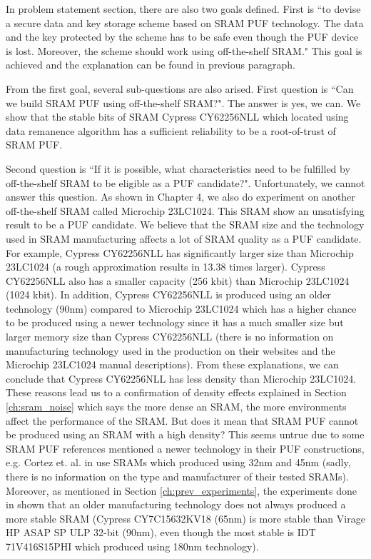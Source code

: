 In problem statement section, there are also two goals defined. First is ``to devise a secure data and key storage scheme based on SRAM PUF technology. The data and the key protected by the scheme has to be safe even though the PUF device is lost. Moreover, the scheme should work using off-the-shelf SRAM." This goal is achieved and the explanation can be found in previous paragraph.

From the first goal, several sub-questions are also arised. First question is ``Can we build SRAM PUF using off-the-shelf SRAM?". The answer is yes, we can. We show that the stable bits of SRAM Cypress CY62256NLL which located using data remanence algorithm has a sufficient reliability to be a root-of-trust of SRAM PUF.

Second question is ``If it is possible, what characteristics need to be fulfilled by off-the-shelf SRAM to be eligible as a PUF candidate?". Unfortunately, we cannot answer this question. As shown in Chapter 4, we also do experiment on another off-the-shelf SRAM called Microchip 23LC1024. This SRAM show an unsatisfying result to be a PUF candidate. We believe that the SRAM size and the technology used in SRAM manufacturing affects a lot of SRAM quality as a PUF candidate. For example, Cypress CY62256NLL has significantly larger size than Microchip 23LC1024 (a rough approximation results in 13.38 times larger). Cypress CY62256NLL also has a smaller capacity (256 kbit) than Microchip 23LC1024 (1024 kbit). In addition, Cypress CY62256NLL is produced using an older technology (90nm) compared to Microchip 23LC1024 which has a higher chance to be produced using a newer technology since it has a much smaller size but larger memory size than Cypress CY62256NLL (there is no information on manufacturing technology used in the production on their websites and the Microchip 23LC1024 manual descriptions). From these explanations, we can conclude that Cypress CY62256NLL has less density than Microchip 23LC1024. These reasons lead us to a confirmation of density effects  explained in Section \ref{ch:sram_noise} which says the more dense an SRAM, the more environments affect the performance of the SRAM. But does it mean that SRAM PUF cannot be produced using an SRAM with a high density? This seems untrue due to some SRAM PUF references mentioned a newer technology in their PUF constructions, e.g. Cortez et. al. in \cite{7102498} use SRAMs which produced using 32nm and 45nm (sadly, there is no information on the type and manufacturer of their tested SRAMs). Moreover, as mentioned in Section \ref{ch:prev_experiments}, the experiments done in \cite{Schrijen:2012:CAS:2492708.2493033} shown that an older manufacturing technology does not always produced a more stable SRAM (Cypress CY7C15632KV18 (65nm) is more stable than Virage HP ASAP SP ULP 32-bit (90nm), even though the most stable is IDT 71V416S15PHI which produced using 180nm technology).
